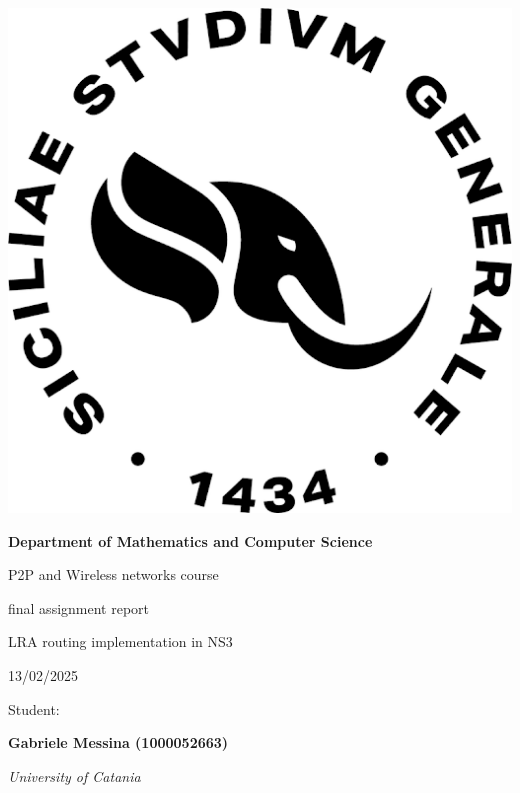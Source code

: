 \documentclass[../report.tex]{subfiles}
\begin{document}
\begin{titlepage}\centering

    \includegraphics[scale=.30]{images/logo_unict.png}
    \vspace{1cm}

    {\LARGE\bfseries Department of Mathematics and Computer Science}

    \vspace{1cm}

    {\Large  P2P and Wireless networks course}
    
    \vspace{.15cm}
    
    {\Large  final assignment report}

    \vspace{.5cm}

    {\large LRA routing implementation in NS3}
    
    \vspace{.5cm}

    {\large 13/02/2025}

    \vspace{2cm}

    {\large Student:}

    {\bfseries Gabriele Messina (1000052663)}

    \vfill

    {\itshape University of Catania}
\end{titlepage}
\end{document}
